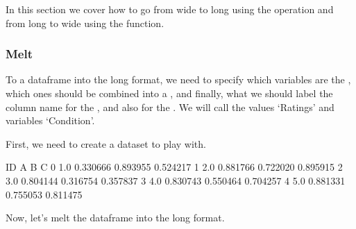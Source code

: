 \documentclass[letterpaper,10pt,english]{sphinxmanual}
\begin{document}
In this section we cover how to go from wide to long using the  operation and from long to wide using the  function.


\subsubsection{Melt}
\label{\detokenize{content/Introduction_to_Pandas:melt}}
To  a dataframe into the long format, we need to specify which variables are the , which ones should be combined into a , and finally, what we should label the column name for the , and also for the . We will call the values ‘Ratings’ and variables ‘Condition’.

First, we need to create a dataset to play with.

\begin{sphinxVerbatim}[commandchars=\\\{\}]
  \PYG{p}{[}  \PYG{p}{]} \PYG{p}{[}  \PYG{p}{]}
\end{sphinxVerbatim}

\begin{sphinxVerbatim}[commandchars=\\\{\}]
    ID         A         B         C
0  1.0  0.330666  0.893955  0.524217
1  2.0  0.881766  0.722020  0.895915
2  3.0  0.804144  0.316754  0.357837
3  4.0  0.830743  0.550464  0.704257
4  5.0  0.881331  0.755053  0.811475
\end{sphinxVerbatim}

Now, let’s melt the dataframe into the long format.
\end{document}
